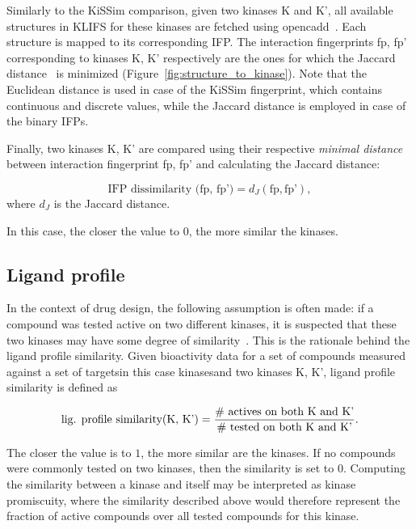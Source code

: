 \documentclass[9pt,training,ASAPversion]{livecoms}
\newcommand{\kinA}{K}
\newcommand{\kinB}{K'}
\begin{document}
Similarly to the KiSSim comparison, given two kinases \kinA{} and \kinB{}, all available structures in KLIFS for these kinases are fetched using opencadd~\cite{Sydow_2022_JOSS}. Each structure is mapped to its corresponding IFP. The interaction fingerprints fp, fp' corresponding to kinases \kinA{}, \kinB{} respectively are the ones for which the Jaccard distance~\cite{Kosub_2019_jpatrec} is minimized (Figure~\ref{fig:structure_to_kinase}). Note that the Euclidean distance is used in case of the KiSSim fingerprint, which contains continuous and discrete values, while the Jaccard distance is employed in case of the binary IFPs.

Finally, two kinases \kinA{}, \kinB{} are compared using their respective \textit{minimal distance} between interaction fingerprint fp, fp' and calculating the Jaccard distance:

\begin{equation}
    \text{IFP dissimilarity (fp, fp')} = d_J(\text{fp}, \text{fp'}),
\end{equation}
where $d_J$ is the Jaccard distance.

In this case, the closer the value to $0$, the more similar the kinases.

\subsection{Ligand profile}
In the context of drug design, the following assumption is often made: if a compound was tested active on two different kinases, it is suspected that these two kinases may have some degree of similarity~\cite{Barelier_2015_ACSChemBio}. This is the rationale behind the ligand profile similarity.
Given bioactivity data for a set of compounds measured against a set of targets\textemdash in this case kinases\textemdash and two kinases \kinA{}, \kinB{}, ligand profile similarity is defined as

\begin{equation}
    \text{lig. profile similarity(\kinA{}, \kinB{})} = \\
\frac{
    \#\text{ actives on both \kinA{} and \kinB{}}}
    {\#\text{ tested on both \kinA{} and \kinB{}}
    }.
\end{equation}

The closer the value is to $1$, the more similar are the kinases.
If no compounds were commonly tested on two kinases, then the similarity is set to $0$.
Computing the similarity between a kinase and itself may be interpreted as kinase promiscuity, where the similarity described above would therefore represent the fraction of active compounds over all tested compounds for this kinase.
\end{document}
